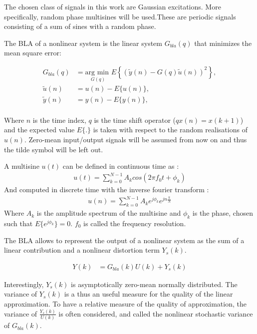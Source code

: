 	The chosen class of signals in this work are Gaussian excitations. More specifically, random phase multisines will be used.These are periodic signals consisting of a sum of sines with a random phase.

	\begin{definition}
		The BLA of a nonlinear system is the linear system $G_{bla}(q)$ that minimizes the mean square error:
		
		\begin{align*}
		   G_{bla}(q) &= \underset{G(q)}{\text{arg min }} E \left\{ \left( \tilde{y}(n) - G(q)\tilde{u}(n)\right)^2 \right\}, \\
		   \tilde{u}(n) &= u(n) - E\{u(n)\},\\
		   \tilde{y}(n) &= y(n) - E\{y(n)\},\\
		\end{align*}

		Where $n$ is the time index, $q$ is the time shift operator ($qx(n) = x(k+1)$) and the expected value $E\{.\}$ is taken with respect to the random realisations of $u(n)$. Zero-mean input/output signals will be assumed from now on and thus the tilde symbol will be left out.
	\end{definition}

	\begin{definition}
	A multisine $u(t)$ can be defined in continuous time as : 
	\begin{align}
		u(t) = \sum^{N-1}_{k = 0} A_k cos(2\pi f_0t + \phi_k)
	\end{align}
	And computed in discrete time with the inverse fourier transform :
	\begin{align}
		u(n) = \sum^{N-1}_{k = 0} A_k e^{j\phi_k} e^{jn\frac{k}{N}}
	\end{align}
		Where $A_k$ is the amplitude spectrum of the multisine and $\phi_k$ is the phase, chosen such that $E\{e^{j\phi_k}\} = 0$. $f_0$ is called the frequency resolution.
	\end{definition}
	
	The BLA allows to represent the output of a nonlinear system as the sum of a linear contribution and a nonlinear distortion term $Y_s(k)$.
	
	\begin{align}
		Y(k) &= G_{bla}(k)U(k) + Y_s(k)	
	\end{align}
	
	Interestingly, $Y_s(k)$ is asymptotically zero-mean normally distributed. The variance of $Y_s(k)$ is a thus an useful measure for the quality of the linear approximation. To have a relative measure of the quality of approximation, the variance of $\frac{Y_s(k)}{U(k)}$ is often considered, and called the nonlinear stochastic variance of $G_{bla}(k)$.

